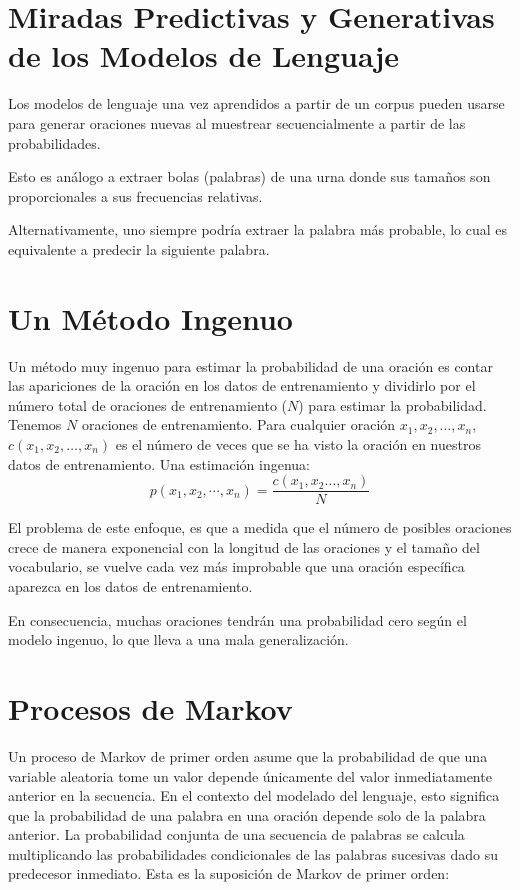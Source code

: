 \section{Miradas Predictivas y Generativas de los Modelos de Lenguaje}

Los modelos de lenguaje una vez aprendidos a partir de un corpus pueden usarse para generar oraciones nuevas al muestrear secuencialmente a partir de las probabilidades.

Esto es análogo a extraer bolas (palabras) de una urna donde sus tamaños son proporcionales a sus frecuencias relativas.

Alternativamente, uno siempre podría extraer la palabra más probable, lo cual es equivalente a predecir la siguiente palabra.


\section{Un Método Ingenuo}
Un método muy ingenuo para estimar la probabilidad de una oración es contar las apariciones de la oración en los datos de entrenamiento y dividirlo por el número total de oraciones de entrenamiento ($N$) para estimar la probabilidad. Tenemos $N$ oraciones de entrenamiento.
Para cualquier oración $x_1, x_2, \ldots, x_n$, $c(x_1, x_2, \ldots, x_n)$ es el número de veces que se ha visto la oración en nuestros datos de entrenamiento. Una estimación ingenua: \begin{displaymath}
p(x_1,x_2,\cdots,x_n)=\frac{c(x_1,x_2 \dots,x_n)}{N}
\end{displaymath}

El problema de este enfoque, es que a medida que el número de posibles oraciones crece de manera exponencial con la longitud de las oraciones y el tamaño del vocabulario, se vuelve cada vez más improbable que una oración específica aparezca en los datos de entrenamiento.

En consecuencia, muchas oraciones tendrán una probabilidad cero según el modelo ingenuo, lo que lleva a una mala generalización.

\section{Procesos de Markov}


Un proceso de Markov de primer orden asume que la probabilidad de que una variable aleatoria tome un valor depende únicamente del valor inmediatamente anterior en la secuencia. En el contexto del modelado del lenguaje, esto significa que la probabilidad de una palabra en una oración depende solo de la palabra anterior. La probabilidad conjunta de una secuencia de palabras se calcula multiplicando las probabilidades condicionales de las palabras sucesivas dado su predecesor inmediato. Esta es la suposición de Markov de primer orden:

